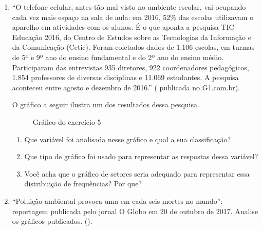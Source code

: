 \begin{enumerate}
\begin{enumerate}
\end{enumerate}

\item ``O telefone celular, antes tão mal visto no ambiente escolar, vai ocupando cada vez mais espaço na sala de aula: em 2016, 52\% das escolas utilizavam o aparelho em atividades com os alunos. É o que aponta a pesquisa TIC Educação 2016, do Centro de Estudos sobre as Tecnologias da Informação e da Comunicação (Cetic).
Foram coletados dados de 1.106 escolas, em turmas de 5º e 9º ano do ensino fundamental e do 2º ano do ensino médio. Participaram das entrevistas 935 diretores, 922 coordenadores pedagógicos, 1.854 professores de diversas disciplinas e 11.069 estudantes. A pesquisa aconteceu entre agosto e dezembro de 2016.'' ( publicada no G1.com.br).

O gráfico a seguir ilustra um dos resultados dessa pesquisa.

\begin{figure}[H]
\centering
\capstart

\noindent{}
\caption{Gráfico do exercício 5}\label{\detokenize{PE103-E:fig-internet-tic}}\label{\detokenize{PE103-E:id16}}\end{figure}
\begin{enumerate}
\item {} 
Que variável foi analisada nesse gráfico e qual a sua classificação?

\item {} 
Que tipo de gráfico foi usado para representar as respostas dessa variável?

\item {} 
Você acha que o gráfico de setores seria adequado para representar essa distribuição de frequências? Por que?

\end{enumerate}

\item ``Poluição ambiental provoca uma em cada seis mortes no mundo'': reportagem publicada pelo jornal O Globo em 20 de outubro de 2017. Analise os gráficos publicados.
().

\begin{figure}[H]
\centering
\capstart


\end{figure}
\end{enumerate}
